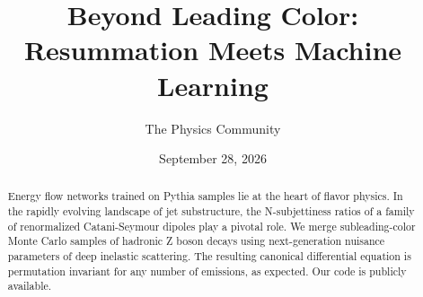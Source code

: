 \documentclass[11pt]{article}
\title{Beyond Leading Color: Resummation Meets Machine Learning}
\author{The Physics Community}
\date{September 28, 2026}
\numberwithin{equation}{section}
\theoremstyle{definition}
\theoremstyle{remark}
\begin{document}
\maketitle
\begin{abstract}
Energy flow networks trained on Pythia samples lie at the heart of
flavor physics. In the rapidly evolving landscape of jet substructure,
the N-subjettiness ratios of a family of renormalized Catani-Seymour
dipoles play a pivotal role. We merge subleading-color Monte Carlo
samples of hadronic Z boson decays using next-generation nuisance
parameters of deep inelastic scattering. The resulting canonical
differential equation is permutation invariant for any number of
emissions, as expected. Our code is publicly available.
\end{abstract}
\tableofcontents




\nocite{*}


\end{document}
